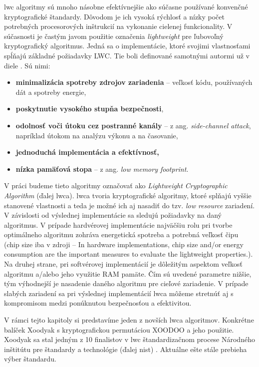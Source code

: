 \acrshort{lwc} algoritmy sú mnoho násobne efektívnejšie ako súčasne používané konvenčné kryptografické štandardy. Dôvodom je ich vysoká rýchlosť a nízky počet potrebných procesorových inštrukcií na vykonanie cielenej funkcionality. V súčasnosti je častým javom použitie označenia \textit{lightweight} pre ľubovoľný kryptografický algoritmus. Jedná sa o implementácie, ktoré svojimi vlastnosťami spĺňajú základné požiadavky LWC. Tie boli definované samotnými autormi už v diele \cite{lwc}. Sú nimi: 
\begin{itemize}
	\item{\textbf{minimalizácia spotreby zdrojov zariadenia}} -- veľkosť kódu, používaných dát a spotreby energie,
	\item{\textbf{poskytnutie vysokého stupňa bezpečnosti}},
	\item{\textbf{odolnosť voči útoku cez postranné kanály} -- z ang. \textit{side-channel attack}}, napríklad útokom na analýzu výkonu a na časovanie, 
	\item{\textbf{jednoduchá implementácia a efektívnosť,}}
	\item{\textbf{nízka pamäťová stopa}} -- z ang. \textit{low memory footprint}.
\end{itemize}

V práci budeme tieto algoritmy označovať ako \textit{Lightweight Cryptographic Algorithm} (ďalej \acrshort{lwca}).
\acrshort{lwca} tvoria kryptografické algoritmy, ktoré splňajú vyššie stanovené vlastnosti a teda je možné ich aj nasadiť do tzv. \textit{low resource} zariadení. V závislosti od výslednej implementácie sa sledujú požiadavky na daný algoritmus. V prípade hardvérovej implementácie najväčšiu rolu pri tvorbe optimálneho algoritmu zohráva energetická spotreba a potrebná veľkosť čipu (chip size iba v zdroji -- In hardware implementations, chip size and/or energy
consumption are the important measures to evaluate the lightweight properties.). Na druhej strane, pri softvérovej implementácií je dôležitým aspektom veľkosť algoritmu a/alebo jeho využitie RAM pamäte. Čím sú uvedené parametre nižšie, tým výhodnejší je nasadenie daného algoritmu pre cieľové zariadenie. V prípade slabých zariadení sa pri výslednej implementácií \acrshort{lwca} môžeme stretnúť aj s kompromisom medzi ponúknutou bezpečnosťou a efektivitou.

V rámci tejto kapitoly si predstavíme jeden z novších \acrshort{lwca} algoritmov. Konkrétne balíček Xoodyak s kryptografickou permutáciou XOODOO \cite{tkecak} a jeho použitie. Xoodyak sa stal jedným z 10 finalistov v \acrshort{lwc} štandardizačnom procese Národného inštitútu pre štandardy a technológie (ďalej \acrshort{nist}) \cite{lwc3}. Aktuálne ešte stále prebieha výber štandardu.

